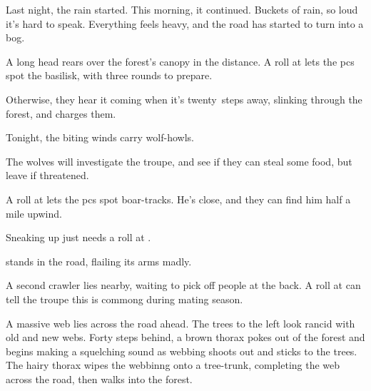 \ifcase\value{cycle}


\begin{boxtext}
  Last night, the rain started.
  This morning, it continued.
  Buckets of rain, so loud it's hard to speak.
  Everything feels heavy, and the road has started to turn into a bog.
\end{boxtext}

A long head rears over the forest's canopy in the distance.
A  roll at \tn[10] lets the \glspl{pc} spot the \gls{basilisk}, with three \glspl{round} to prepare.

Otherwise, they hear it coming when it's twenty~\glspl{step} away, slinking through the forest, and charges them.

\basilisk

\or%

\begin{boxtext}
  Tonight, the biting winds carry wolf-howls.
\end{boxtext}

The wolves will investigate the troupe, and see if they can steal some food, but leave if threatened.

\wolf

\or%

A  roll at \tn[10] lets the \glspl{pc} spot boar-tracks.
He's close, and they can find him half a mile upwind.

\boar

Sneaking up just needs a  roll at
\tn.

\or%

\begin{boxtext}
   stands in the road, flailing its arms madly.
\end{boxtext}

A second \gls{crawler} lies nearby, waiting to pick off people at the back.
A  roll at \tn[10] can tell the troupe this is commong during mating season.

\chitincrawler

\chitincrawler

\or%

\begin{boxtext}
  A massive web lies across the road ahead.
  The trees to the left look rancid with old and new webs.
  Forty \glspl{step} behind, a brown thorax pokes out of the forest and begins making a squelching sound as webbing shoots out and sticks to the trees.
  The hairy thorax wipes the webbinng onto a tree-trunk, completing the web across the road, then walks into the forest.
\end{boxtext}

